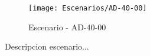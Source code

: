 \begin{figure}[H]
\centering
\texttt{[image: Escenarios/AD-40-00]}
\caption{Escenario - AD-40-00}
\label{fig:AD-40-00}
\end{figure}

Descripcion escenario...
\clearpage
